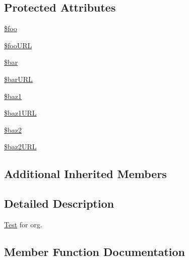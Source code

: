 \subsection*{Protected Attributes}
\begin{DoxyCompactItemize}
\item 
\mbox{\hyperlink{classorg_1_1bovigo_1_1vfs_1_1vfs_stream_wrapper_base_test_case_a7a1efa8a0f6183fb3a5e8e8b0696526c}{\$foo}}
\item 
\mbox{\hyperlink{classorg_1_1bovigo_1_1vfs_1_1vfs_stream_wrapper_base_test_case_a8c8a1f55fdcb7129cd9924e692cb4f78}{\$foo\+U\+RL}}
\item 
\mbox{\hyperlink{classorg_1_1bovigo_1_1vfs_1_1vfs_stream_wrapper_base_test_case_ab669d165b99e23bf90d68a0a057f69ac}{\$bar}}
\item 
\mbox{\hyperlink{classorg_1_1bovigo_1_1vfs_1_1vfs_stream_wrapper_base_test_case_aed2e545b1c67b53c69aa7a0a82fff511}{\$bar\+U\+RL}}
\item 
\mbox{\hyperlink{classorg_1_1bovigo_1_1vfs_1_1vfs_stream_wrapper_base_test_case_ac4fa1be11df2701ae13b62b27ec3f75d}{\$baz1}}
\item 
\mbox{\hyperlink{classorg_1_1bovigo_1_1vfs_1_1vfs_stream_wrapper_base_test_case_a013846563ecee77f34427475f7093209}{\$baz1\+U\+RL}}
\item 
\mbox{\hyperlink{classorg_1_1bovigo_1_1vfs_1_1vfs_stream_wrapper_base_test_case_a405f565a43b7c2dcf45d10e0ca143b63}{\$baz2}}
\item 
\mbox{\hyperlink{classorg_1_1bovigo_1_1vfs_1_1vfs_stream_wrapper_base_test_case_aae84241256dd96fe168fdaad39cbf3b5}{\$baz2\+U\+RL}}
\end{DoxyCompactItemize}
\subsection*{Additional Inherited Members}


\subsection{Detailed Description}
\mbox{\hyperlink{class_test}{Test}} for org. 

\subsection{Member Function Documentation}
\mbox{\label{classorg_1_1bovigo_1_1vfs_1_1vfs_stream_wrapper_base_test_case_a0bc688732d2b3b162ffebaf7812e78da}} 
